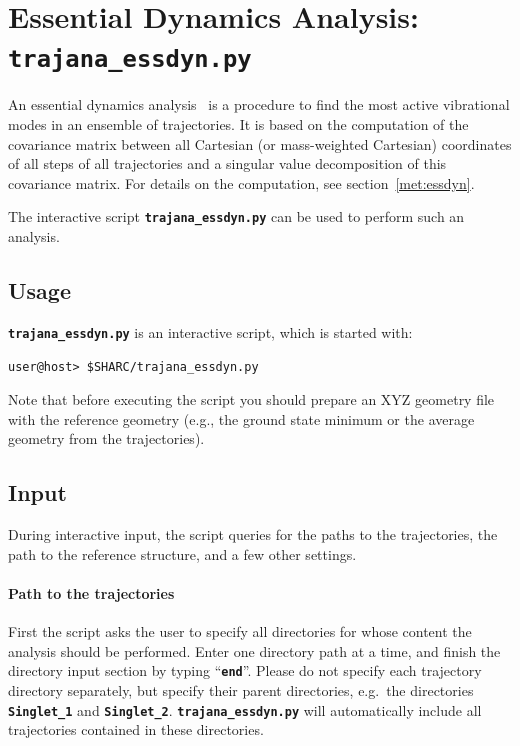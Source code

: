 \documentclass[a4paper,10pt,DIV=15,openany]{scrbook}
\newcommand{\ttt}[1]{\textbf{\texttt{#1}}}
\begin{document}
\section{Essential Dynamics Analysis: \ttt{trajana\_essdyn.py}}\label{sec:trajana_essdyn.py}

An essential dynamics analysis~\cite{Amadei1993PSFB} is a procedure to find the most active vibrational modes in an ensemble of trajectories.
It is based on the computation of the covariance matrix between all Cartesian (or mass-weighted Cartesian) coordinates of all steps of all trajectories and a singular value decomposition of this covariance matrix.
For details on the computation, see section~\ref{met:essdyn}.

The interactive script \ttt{trajana\_essdyn.py} can be used to perform such an analysis.

\subsection{Usage}

\ttt{trajana\_essdyn.py} is an interactive script, which is started with:
\begin{verbatim}
user@host> $SHARC/trajana_essdyn.py
\end{verbatim}
Note that before executing the script you should prepare an XYZ geometry file with the reference geometry (e.g., the ground state minimum or the average geometry from the trajectories).

\subsection{Input}

During interactive input, the script queries for the paths to the trajectories, the path to the reference structure, and a few other settings.

\paragraph{Path to the trajectories}

First the script asks the user to specify all directories for whose content the analysis should be performed. Enter one directory path at a time, and finish the directory input section by typing ``\ttt{end}''. Please do not specify each trajectory directory separately, but specify their parent directories, e.g.\ the directories \ttt{Singlet\_1} and \ttt{Singlet\_2}. \ttt{trajana\_essdyn.py} will automatically include all trajectories contained in these directories.
\end{document}
